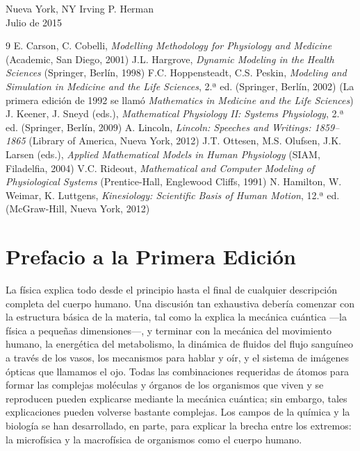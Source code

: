 ﻿\documentclass{book}
\begin{document}
\vspace{1.5em}
\noindent Nueva York, NY \hfill Irving P. Herman \\
Julio de 2015

\vspace{2em}
\begin{thebibliography}{9}
 E. Carson, C. Cobelli, \textit{Modelling Methodology for Physiology and Medicine} (Academic, San Diego, 2001)
 J.L. Hargrove, \textit{Dynamic Modeling in the Health Sciences} (Springer, Berlín, 1998)
 F.C. Hoppensteadt, C.S. Peskin, \textit{Modeling and Simulation in Medicine and the Life Sciences}, 2.ª ed. (Springer, Berlín, 2002) (La primera edición de 1992 se llamó \textit{Mathematics in Medicine and the Life Sciences})
 J. Keener, J. Sneyd (eds.), \textit{Mathematical Physiology II: Systems Physiology}, 2.ª ed. (Springer, Berlín, 2009)
 A. Lincoln, \textit{Lincoln: Speeches and Writings: 1859--1865} (Library of America, Nueva York, 2012)
 J.T. Ottesen, M.S. Olufsen, J.K. Larsen (eds.), \textit{Applied Mathematical Models in Human Physiology} (SIAM, Filadelfia, 2004)
 V.C. Rideout, \textit{Mathematical and Computer Modeling of Physiological Systems} (Prentice-Hall, Englewood Cliffs, 1991)
 N. Hamilton, W. Weimar, K. Luttgens, \textit{Kinesiology: Scientific Basis of Human Motion}, 12.ª ed. (McGraw-Hill, Nueva York, 2012)
\end{thebibliography}


\clearpage

\chapter*{Prefacio a la Primera Edición}

La física explica todo desde el principio hasta el final de cualquier descripción completa del cuerpo humano. Una discusión tan exhaustiva debería comenzar con la estructura básica de la materia, tal como la explica la mecánica cuántica ---la física a pequeñas dimensiones---, y terminar con la mecánica del movimiento humano, la energética del metabolismo, la dinámica de fluidos del flujo sanguíneo a través de los vasos, los mecanismos para hablar y oír, y el sistema de imágenes ópticas que llamamos el ojo. Todas las combinaciones requeridas de átomos para formar las complejas moléculas y órganos de los organismos que viven y se reproducen pueden explicarse mediante la mecánica cuántica; sin embargo, tales explicaciones pueden volverse bastante complejas. Los campos de la química y la biología se han desarrollado, en parte, para explicar la brecha entre los extremos: la microfísica y la macrofísica de organismos como el cuerpo humano.
\end{document}
